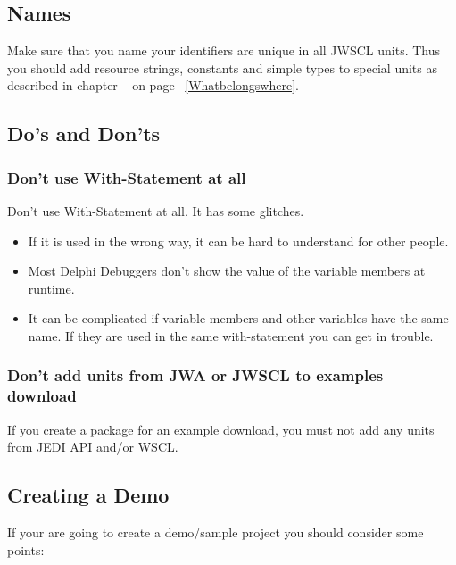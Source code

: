 \documentclass[a4paper,oneside,10pt]{article}
\begin{document}
\subsection{Names}
Make sure that you name your identifiers are unique in all JWSCL units. Thus you should add resource strings, constants and simple types to special units as described in chapter ~\pageref{Whatbelongswhere} on page ~\ref{Whatbelongswhere}.

\subsection{Do's and Don'ts}

\subsubsection{Don't use With-Statement at all}
Don't use With-Statement at all. It has some glitches.

\begin{itemize}
  \item If it is used in the wrong way, it can be hard to understand for other people.
  \item Most Delphi Debuggers don't show the value of the variable members at runtime.
  \item It can be complicated if variable members and other variables have the same name. If they are used in the same with-statement you can get in trouble.
\end{itemize}

\subsubsection{Don't add units from JWA or JWSCL to examples download}
If you create a package for an example download, you must not add any units from JEDI API and/or WSCL.

\subsection{Creating a Demo}
If your are going to create a demo/sample project you should consider some points:
\end{document}

